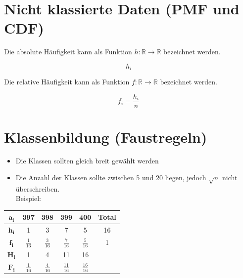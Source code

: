\documentclass[10pt]{article}
\begin{document}
\section*{Nicht klassierte Daten (PMF und CDF)}
Die absolute Häufigkeit kann als Funktion $h: \mathbb{R} \rightarrow \mathbb{R}$ bezeichnet werden.

$$
h_{i}
$$

Die relative Häufigkeit kann als Funktion $f: \mathbb{R} \rightarrow \mathbb{R}$ bezeichnet werden.

$$
f_{i}=\frac{h_{i}}{n}
$$

\section*{Klassenbildung (Faustregeln)}
\begin{itemize}
  \item Die Klassen sollten gleich breit gewählt werden
  \item Die Anzahl der Klassen sollte zwischen 5 und 20 liegen, jedoch $\sqrt{n}$ nicht überschreiben.\\
Beispiel:
\end{itemize}

\begin{center}
\begin{tabular}{|c|c|c|c|c|c|}
\hline
$\boldsymbol{a}_{\boldsymbol{i}}$ & $\mathbf{3 9 7}$ & $\mathbf{3 9 8}$ & $\mathbf{3 9 9}$ & $\mathbf{4 0 0}$ & Total \\
\hline
$\boldsymbol{h}_{\boldsymbol{i}}$ & 1 & 3 & 7 & 5 & 16 \\
\hline
$\boldsymbol{f}_{\boldsymbol{i}}$ & $\frac{1}{16}$ & $\frac{3}{16}$ & $\frac{7}{16}$ & $\frac{5}{16}$ & 1 \\
\hline
$\boldsymbol{H}_{\boldsymbol{i}}$ & 1 & 4 & 11 & 16 &  \\
\hline
$\boldsymbol{F}_{\boldsymbol{i}}$ & $\frac{1}{16}$ & $\frac{4}{16}$ & $\frac{11}{16}$ & $\frac{16}{16}$ &  \\
\hline
\end{tabular}
\end{center}
\end{document}
